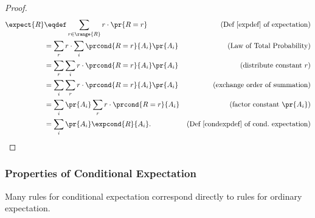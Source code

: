 \begin{proof}
  \begin{align*}
    \expect{R} &\eqdef \sum_{r \in \range{R}} r \cdot \pr{R=r}
                  & \text{(Def~\ref{expdef} of expectation)}\\
    &= \sum_r r \cdot \sum_i \prcond{R=r}{A_i} \pr{A_i}
            & \text{(Law of Total Probability)}\\
    &= \sum_r \sum_i r \cdot \prcond{R=r}{A_i} \pr{A_i}
              & \text{(distribute constant $r$)}\\
    &= \sum_i \sum_r r \cdot \prcond{R=r}{A_i} \pr{A_i}
              & \text{(exchange order of summation)}\\
    &= \sum_i \pr{A_i} \sum_r r \cdot \prcond{R=r}{A_i}
             & \text{(factor constant $\pr{A_i}$)}\\
    &= \sum_i \pr{A_i} \expcond{R}{A_i}.
             & \text{(Def~\ref{condexpdef} of cond.\ expectation)}
  \end{align*}
\end{proof}


\subsubsection{Properties of Conditional Expectation}
\iffalse
If a random variable is independent of an event, then conditional
expectation given that event coincides with ordinary expectation:
\begin{lemma}\label{RIA}
If $R$ and $I_A$ are independent random variables, then
\[
\expcond{R}{A} = \expect{R}.
\]
\end{lemma}

\begin{proof}
If $R$ and $I_A$ are independent, then
\[
\prcond{R=r}{A} = \prcond{R=r}{I_A=1} = \pr{R=r}
\]
by the definition of independence of random variables, so the righthand
side of equation~\eqref{condexpsumv} for conditional expectation coincides
with the righthand side of the corresponding equation~\eqref{expsumv} for
ordinary expectation.
\end{proof}
\fi

Many rules for conditional expectation correspond directly to rules for
ordinary expectation.\iffalse
For example, we can calculate conditional
expectations by summing over outcomes instead of values:
\begin{theorem}\label{alt:condexpdef}
\begin{equation}\label{condexpsumssp}
\expcond{R}{A} = \sum_{\omega \in \sspace} R(\omega) \prcond{w}{A}.
\end{equation}
\end{theorem}
The proof of Theorem~\ref{alt:condexpdef} is essentially the same as the
proof of the corresponding Theorem~\ref{alt:expdef} for ordinary
expectation, so we won't repeat it.\fi


